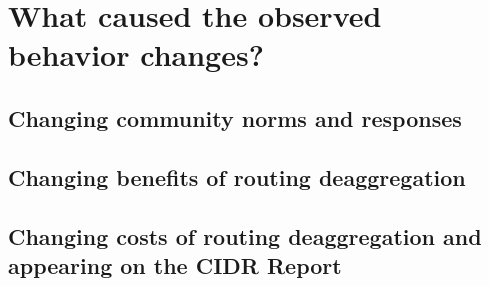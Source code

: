 \section{What caused the observed behavior changes?}
\subsection{Changing community norms and responses}
\subsection{Changing benefits of routing deaggregation}
\subsection{Changing costs of routing deaggregation and appearing on the CIDR Report}


